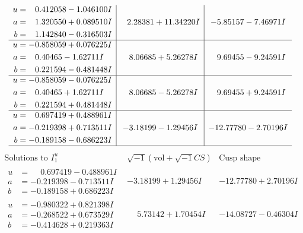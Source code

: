 \documentclass[1p]{elsarticle_modified}
\theoremstyle{definition}
\newcommand{\I}{\sqrt{-1}}
\begin{document}
$$\begin{array}{c|c|c}
\begin{aligned}
u &= \phantom{-}0.412058 - 1.046100 I \\
a &= \phantom{-}1.320550 + 0.089510 I \\
b &= \phantom{-}1.142840 - 0.316503 I\end{aligned}
 & \phantom{-}2.28381 + 11.34220 I & -5.85157 - 7.46971 I \\ \hline\begin{aligned}
u &= -0.858059 + 0.076225 I \\
a &= \phantom{-}0.40465 - 1.62711 I \\
b &= \phantom{-}0.221594 - 0.481448 I\end{aligned}
 & \phantom{-}8.06685 + 5.26278 I & \phantom{-}9.69455 - 9.24591 I \\ \hline\begin{aligned}
u &= -0.858059 - 0.076225 I \\
a &= \phantom{-}0.40465 + 1.62711 I \\
b &= \phantom{-}0.221594 + 0.481448 I\end{aligned}
 & \phantom{-}8.06685 - 5.26278 I & \phantom{-}9.69455 + 9.24591 I \\ \hline\begin{aligned}
u &= \phantom{-}0.697419 + 0.488961 I \\
a &= -0.219398 + 0.713511 I \\
b &= -0.189158 - 0.686223 I\end{aligned}
 & -3.18199 - 1.29456 I & -12.77780 - 2.70196 I\\
 \hline 
 \end{array}$$\newpage$$\begin{array}{c|c|c}  
\text{Solutions to }I^u_{1}& \I (\text{vol} + \sqrt{-1}CS) & \text{Cusp shape}\\
 \hline 
\begin{aligned}
u &= \phantom{-}0.697419 - 0.488961 I \\
a &= -0.219398 - 0.713511 I \\
b &= -0.189158 + 0.686223 I\end{aligned}
 & -3.18199 + 1.29456 I & -12.77780 + 2.70196 I \\ \hline\begin{aligned}
u &= -0.980322 + 0.821398 I \\
a &= -0.268522 + 0.673529 I \\
b &= -0.414628 + 0.219363 I\end{aligned}
 & \phantom{-}5.73142 + 1.70454 I & -14.08727 - 0.46304 I \\ \hline\begin{aligned}

\end{aligned}
\end{array}$$
\end{document}
